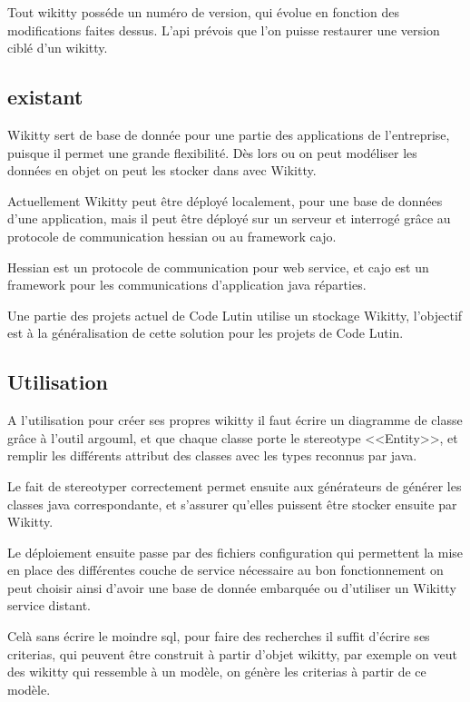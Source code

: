 Tout wikitty posséde un numéro de version, qui évolue en fonction des
modifications faites dessus. L'api prévois que l'on puisse restaurer une version
ciblé d'un wikitty.

\subsection{existant}

Wikitty sert de base de donnée pour une partie des applications de l'entreprise,
puisque il permet une grande flexibilité. Dès lors ou on peut modéliser les
données en objet on peut les stocker dans avec Wikitty.

Actuellement Wikitty peut être déployé localement, pour une base de données
d'une application, mais il peut être déployé sur un serveur et interrogé grâce
au protocole de communication hessian ou au framework cajo.

Hessian est un protocole de communication pour web service, et cajo est un
framework pour les communications d'application java réparties. 

Une partie des projets actuel de Code Lutin utilise un stockage Wikitty, 
l'objectif est à la généralisation de cette solution pour les projets de 
Code Lutin.

\subsection{Utilisation}

A l'utilisation pour créer ses propres wikitty il faut écrire un diagramme de
classe grâce à l'outil argouml, et que chaque classe porte le stereotype
<<Entity>>, et remplir les différents attribut des classes avec les types
reconnus par java. 

Le fait de stereotyper correctement permet ensuite aux générateurs de générer
les classes java correspondante, et s'assurer qu'elles puissent être stocker
ensuite par Wikitty.

Le déploiement ensuite passe par des fichiers configuration qui permettent la
mise en place des différentes couche de service nécessaire au bon fonctionnement
on peut choisir ainsi d'avoir une base de donnée embarquée ou d'utiliser un
Wikitty service distant.

Celà sans écrire le moindre sql, pour faire des recherches il suffit d'écrire
ses criterias, qui peuvent être construit à partir d'objet wikitty, par exemple 
on veut des wikitty qui ressemble à un modèle, on génère les criterias à partir
de ce modèle.

